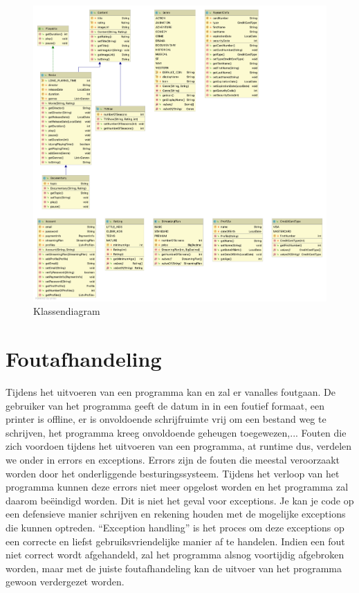 \documentclass{tstextbook}
\begin{document}
\begin{figure}[H]
  \includegraphics[width=\linewidth]{images/klassendiagram/diagram_H2.png}
  \caption{Klassendiagram}
  \label{fig:klassendiagram}
\end{figure}

\chapter{Foutafhandeling}

\begin{summary}
Tijdens het uitvoeren van een programma kan en zal er vanalles foutgaan. De gebruiker van het programma geeft de datum in in een foutief formaat, een printer is offline, er is onvoldoende schrijfruimte vrij om een bestand weg te schrijven, het programma kreeg onvoldoende geheugen toegewezen,... Fouten die zich voordoen tijdens het uitvoeren van een programma, at runtime dus, verdelen we onder in errors en exceptions. Errors zijn de fouten die meestal veroorzaakt worden door het onderliggende besturingssysteem. Tijdens het verloop van het programma kunnen deze errors niet meer opgelost worden en het programma zal daarom be\"eindigd worden. Dit is niet het geval voor exceptions. Je kan je code op een defensieve manier schrijven en rekening houden met de mogelijke exceptions die kunnen optreden. ``Exception handling'' is het proces om deze exceptions op een correcte en liefst gebruiksvriendelijke manier af te handelen. Indien een fout niet correct wordt afgehandeld, zal het programma alsnog voortijdig afgebroken worden, maar met de juiste foutafhandeling kan de uitvoer van het programma gewoon verdergezet worden. 
 \end{summary}
 
\end{document}
